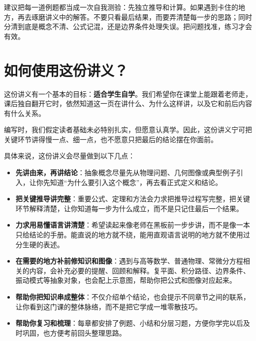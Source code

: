 \begin{tishi}
建议把每一道例题都当成一次自我测验：先独立推导和计算。如果遇到卡住的地方，再去琢磨讲义中的解答。不要只看最后结果，而要弄清楚每一步的思路；同时分清到底是概念不清、公式记混，还是边界条件处理失误。把问题找准，练习才会有效。
\end{tishi}


\section*{如何使用这份讲义？}

这份讲义有一个基本的目标：\textbf{适合学生自学}。我们希望你在课堂上能跟着老师走，课后独自翻开它时，依然知道这一页在讲什么、为什么这样讲，以及它和前后内容有什么关系。

编写时，我们假定读者基础未必特别扎实，但愿意认真学。因此，这份讲义宁可把关键环节讲得慢一点、细一点，也不愿意只把最后的结论摆在你面前。

具体来说，这份讲义会尽量做到以下几点：

\begin{itemize}
    \item \textbf{先讲由来，再讲结论}：抽象概念尽量先从物理问题、几何图像或典型例子引入，让你先知道``为什么要引入这个概念''，再去看正式定义和结论。
    
    \item \textbf{把关键推导讲完整}：重要公式、定理和方法会力求把推导过程写完整，把关键环节解释清楚，让你知道每一步为什么成立，而不是只记住最后一个结果。
    
    \item \textbf{力求用易懂语言讲清楚}：希望读起来像老师在黑板前一步步讲，而不是像一本只给结论的手册。能直说的地方就不绕，能用直观语言说明的地方就不使用过分生硬的表述。
    
    \item \textbf{在需要的地方补前修知识和图像}：遇到与高等数学、普通物理、常微分方程相关的内容，会补充必要的提醒、回顾和解释。复平面、积分路径、边界条件、振动模式等抽象对象，也会配上示意图，帮助你把公式和图像对应起来。
    
    \item \textbf{帮助你把知识串成整体}：不仅介绍单个结论，也会提示不同章节之间的联系，让你看到这门课的整体脉络，而不是把它学成一堆零散技巧。
    
    \item \textbf{帮助你复习和梳理}：每章都安排了例题、小结和分层习题，方便你学完以后及时巩固，也方便考前回头整理思路。
\end{itemize}

